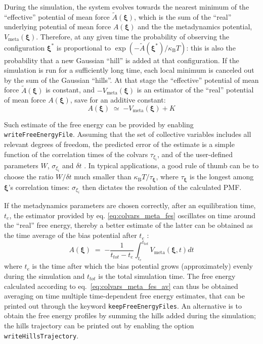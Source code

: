 During the simulation, the system evolves towards the nearest minimum of the ``effective'' potential of mean force $\tilde{A}(\bm{\xi})$, which is the sum of the ``real'' underlying potential of mean force $A(\bm{\xi})$  and the the metadynamics potential, $V_{\mathrm{meta}}(\bm{\xi})$.
Therefore, at any given time the probability of observing the configuration $\bm{\xi^{*}}$ is proportional to $\exp\left(-\tilde{A}(\bm{\xi^{*}})/\kappa_{\mathrm{B}}T\right)$: this is also the probability that a new Gaussian ``hill'' is added at that configuration.
If the simulation is run for a sufficiently long time, each local minimum is canceled out by the sum of the Gaussian ``hills''.
At that stage the ``effective'' potential of mean force $\tilde{A}(\bm{\xi})$ is constant, and $-V_{\mathrm{meta}}(\bm{\xi})$ is an estimator of the ``real'' potential of mean force $A(\bm{\xi})$,  save for an additive constant:
\begin{equation}
  \label{eq:colvars_meta_fes}
  A(\bm{\xi}) \; \simeq \; {
    -V_{\mathrm{meta}}(\bm{\xi}) + K
  }
\end{equation}

Such estimate of the free energy can be provided by enabling \texttt{writeFreeEnergyFile}.
Assuming that the set of collective variables includes all relevant degrees of freedom, the predicted error of the estimate is a simple function of the correlation times of the colvars $\tau_{\xi_{i}}$, and of the user-defined parameters $W$, $\sigma_{\xi_{i}}$ and $\delta{}t$ \cite{Bussi2006}.
In typical applications, a good rule of thumb can be to choose the ratio $W/\delta{}t$ much smaller than $\kappa_{\mathrm{B}}T/\tau_{\bm{\xi}}$, where $\tau_{\bm{\xi}}$ is the longest among $\bm{\xi}$'s correlation times: $\sigma_{\xi_{i}}$ then dictates the resolution of the calculated PMF.

If the metadynamics parameters are chosen correctly, after an equilibration time, $t_{e}$, the estimator provided
by eq. \ref{eq:colvars_meta_fes} oscillates on time around the ``real'' free energy, thereby a better estimate of the latter can be obtained as the time average of the bias potential after $t_{e}$ \cite{Marinelli2009,Crespo2010}:
\begin{equation}
  \label{eq:colvars_meta_fes_av}
  A\left(\bm{\xi}\right) \; = \; {-\frac{1}{t_{tot}-t_{e}} \int_{t_{e}}^{t_{tot}} {
    V_{\mathrm{meta}}(\bm{\xi},t)dt}
  }
\end{equation}
where $t_{e}$ is the time after which the bias potential grows (approximately) evenly during the simulation and $t_{tot}$ is the total simulation time. The free energy calculated according to eq.~\ref{eq:colvars_meta_fes_av} can thus be obtained averaging on time multiple time-dependent free energy estimates, that can be printed out through the keyword \texttt{keepFreeEnergyFiles}. An alternative is to obtain the free energy profiles by summing the hills added during the simulation; the hills trajectory can be printed out by enabling the option \texttt{writeHillsTrajectory}.



